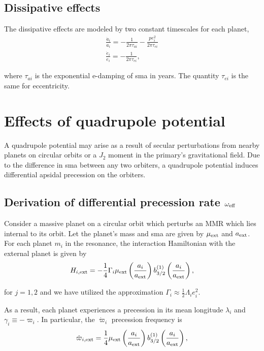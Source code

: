 \documentclass[11pt]{article}
\begin{document}
\subsection{Dissipative effects}
\label{sec:org9f602e4}
The dissipative effects are modeled
by two constant timescales for each planet, 
\begin{align}
  \frac{\dot a_i}{a_i} = -\frac{1}{2\pi\tau_{ai}} - \frac{pe_i^2}{2\pi\tau_{ei}} \\
  \frac{\dot e_i}{e_i} = -\frac{1}{2\pi\tau_{ei}} ,
\end{align}

where \(\tau_{ai}\) is the exponential e-damping of sma in years.  The
quantity \(\tau_{ei}\) is the same for eccentricity.

\section{Effects of quadrupole potential}
\label{sec:org1d76aa9}
A quadrupole potential may arise as a result of secular perturbations
from nearby planets on circular orbits or a \(J_2\) moment in the
primary's gravitational field. Due to the difference in sma
between any two orbiters, a quadrupole potential induces
differential apsidal precession on the orbiters.

\subsection{Derivation of differential precession rate \(\omega_{\rm eff}\)}
\label{sec:org10c5bee}
Consider a massive planet on a circular orbit which perturbs an MMR
which lies internal to its orbit.  Let the planet's mass and sma are
given by \(\mu_{\rm ext}\) and \(a_{\rm ext}\).  For each planet \(m_i\) in
the resonance, the interaction Hamiltonian with the external
planet is given by
\begin{equation}
  H_{i,\rm ext} = -\frac14 \Gamma_i \mu_{\rm ext}
  \left(\frac{a_i}{a_{\rm ext}}\right) b_{3/2}^{(1)}\left(\frac{a_i}{a_{\rm ext}}\right),
\end{equation}

\noindent
for \(j=1,2\) and we have utilized the approximation \(\Gamma_i \approx \frac12 \Lambda_i e_i^2\).

As a result, each planet experiences a precession in its mean longitude \(\lambda_i\) and
\(\gamma_i\equiv -\varpi_i\). In particular, the \(\dot\varpi_i\) precession frequency
is
\begin{equation}
\dot\varpi_{i, \rm ext} = \frac14 \mu_{\rm ext} 
    \left(\frac{a_i}{a_{\rm ext}}\right) b_{3/2}^{(1)}\left(\frac{a_i}{a_{\rm ext}}\right),
\end{equation}
\end{document}
